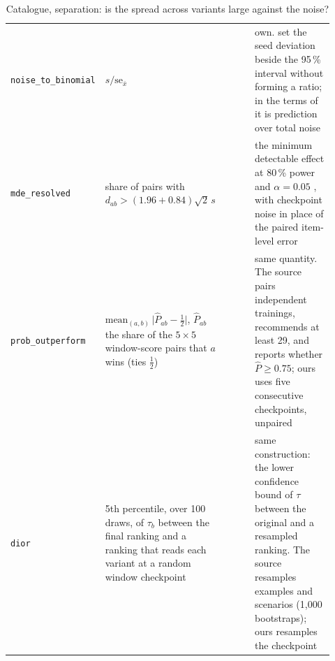 \begin{table}[h]
\begin{tabular}{@{}p{0.215\linewidth}p{0.28\linewidth}p{0.14\linewidth}p{0.285\linewidth}@{}}
\texttt{noise\_to\_binomial} & $s/\mathrm{se}_{\bar{x}}$ & \citet{madaan_quantifying_2024, wang_measuring_2025} & own. \citet{madaan_quantifying_2024} set the seed deviation beside the 95\,\% interval without forming a ratio; in the terms of \citet{wang_measuring_2025} it is prediction over total noise \\
\texttt{mde\_resolved} & share of pairs with $d_{ab} > (1.96 + 0.84)\sqrt{2}\,s$ & \citet{card_little_2020, miller_adding_2024} & the minimum detectable effect at 80\,\% power and $\alpha = 0.05$ \citep[Eq.~10]{miller_adding_2024}, with checkpoint noise in place of the paired item-level error \\
\texttt{prob\_outperform} & $\mathrm{mean}_{(a,b)}\,\big|\hat{P}_{ab} - \tfrac12\big|$, $\hat{P}_{ab}$ the share of the $5 \times 5$ window-score pairs that $a$ wins (ties $\tfrac12$) & \citet{bouthillier_accounting_2021} & same quantity. The source pairs independent trainings, recommends at least 29, and reports whether $\hat{P} \geq 0.75$; ours uses five consecutive checkpoints, unpaired \\
\texttt{dior} & 5th percentile, over 100 draws, of $\tau_b$ between the final ranking and a ranking that reads each variant at a random window checkpoint & \citet{perlitz_efficient_2024} & same construction: the lower confidence bound of $\tau$ between the original and a resampled ranking. The source resamples examples and scenarios (1{,}000 bootstraps); ours resamples the checkpoint \\
\bottomrule
\end{tabular}
\caption{Catalogue, separation: is the spread across variants large against the noise?}
\label{tab:sur-separation}
\end{table}

